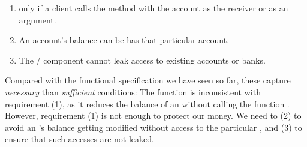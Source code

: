 \begin{enumerate}
\item %
 only  if a client   calls the  method  with the
  account as the receiver or as an argument. 
\item An account's balance can be  has
   that  particular account. %
\item The / component cannot leak access to existing accounts or banks. 
\end{enumerate}

Compared with the functional specification we have seen so far, these
capture \emph{necessary} %
 than
\emph{sufficient} conditions:  
The  function 
 is inconsistent with requirement  (1), as it reduces the balance of an  without calling the
function . 
However, requirement  (1) is not enough to protect our money. We need to (2) to avoid an 's balance getting
modified without access to the particular , and (3) to ensure that such accesses are not leaked. 


